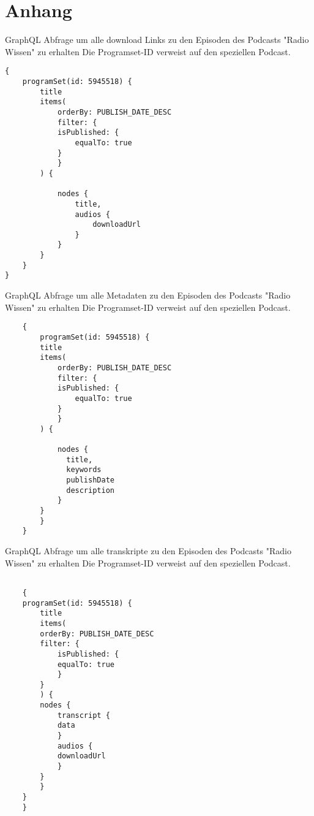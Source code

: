 \chapter{Anhang}\label{app:supplemental-information}


\label{ch:graphql-1}
GraphQL Abfrage um alle download Links zu den Episoden des Podcasts "Radio Wissen" zu erhalten
Die Programset-ID verweist auf den speziellen Podcast.

\begin{verbatim}
{
    programSet(id: 5945518) {
        title
        items(
            orderBy: PUBLISH_DATE_DESC
            filter: {
            isPublished: {
                equalTo: true
            }
            }
        ) {
            
            nodes {
                title,
                audios {
                    downloadUrl
                }
            }
        }
    }
}

\end{verbatim}

\label{ch:graphql-2}
GraphQL Abfrage um alle Metadaten zu den Episoden des Podcasts "Radio Wissen" zu erhalten
Die Programset-ID verweist auf den speziellen Podcast.

\begin{verbatim}
    {
        programSet(id: 5945518) {
        title
        items(
            orderBy: PUBLISH_DATE_DESC
            filter: {
            isPublished: {
                equalTo: true
            }
            }
        ) {
          	
            nodes {
              title,
              keywords
              publishDate
              description
            }
        }
        }
    }

\end{verbatim}

\label{ch:graphql-3}
GraphQL Abfrage um alle transkripte zu den Episoden des Podcasts "Radio Wissen" zu erhalten
Die Programset-ID verweist auf den speziellen Podcast.

\begin{verbatim}

    {
    programSet(id: 5945518) {
        title
        items(
        orderBy: PUBLISH_DATE_DESC
        filter: {
            isPublished: {
            equalTo: true
            }
        }
        ) {
        nodes {
            transcript {
            data
            }
            audios {
            downloadUrl
            }
        }
        }
    }
    }
\end{verbatim}

